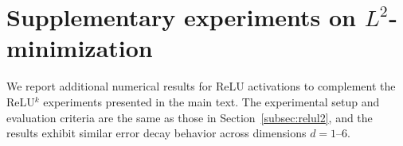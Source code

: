 \documentclass{article}
\theoremstyle{remark}
\begin{document}

\appendix
\section{Supplementary experiments on $L^2$-minimization} \label{app:supp-l2}
We report additional numerical results for ReLU activations to complement the ReLU$^k$ experiments presented in the main text. The experimental setup and evaluation criteria are the same as those in Section~\ref{subsec:relul2}, and the results exhibit similar error decay behavior across dimensions $d=1$--$6$.
\end{document}
